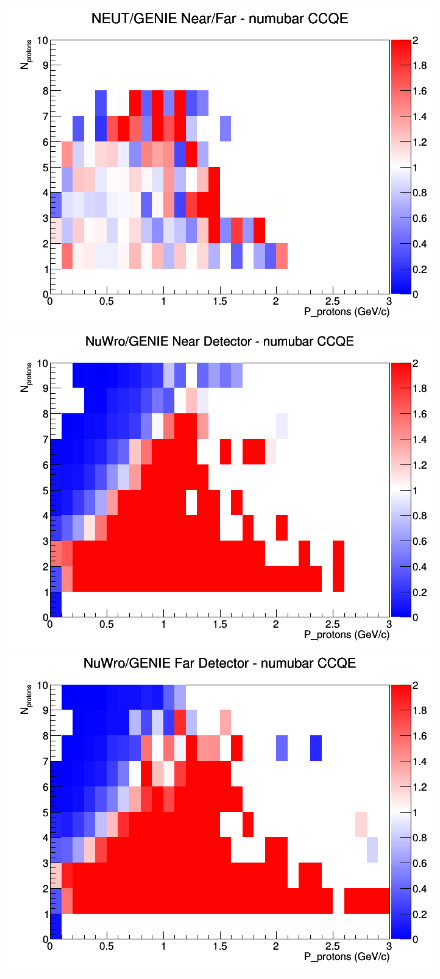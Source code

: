 \begin{figure}[h]
\endminipage
{}
\includegraphics[width=\linewidth]{N_P/nominal/protons/ratios/CCQE_NEUT_GENIE_numubar_NF_N_P.png}
\endminipage
\newline
{}
\includegraphics[width=\linewidth]{N_P/nominal/protons/ratios/CCQE_NuWro_GENIE_numubar_near_N_P.png}
\endminipage
{}
\includegraphics[width=\linewidth]{N_P/nominal/protons/ratios/CCQE_NuWro_GENIE_numubar_far_N_P.png}

\end{figure}
